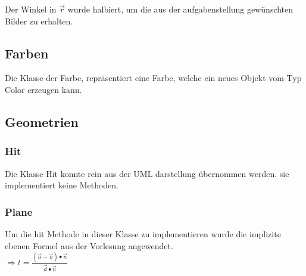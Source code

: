 \documentclass[14pt]{extarticle}
\begin{document}
Der Winkel in \begin{math}\vec{r}\end{math} wurde halbiert, um die aus der aufgabenstellung gewünschten Bilder zu erhalten.

\subsection{Farben}
Die Klasse der Farbe, repräsentiert eine Farbe, welche ein neues Objekt vom Typ Color erzeugen kann.
\subsection{Geometrien}
\subsubsection{Hit}
Die Klasse Hit konnte rein aus der UML darstellung übernommen werden. sie implementiert keine Methoden. 
\subsubsection{Plane}
Um die hit Methode in dieser Klasse zu implementieren wurde die implizite ebenen Formel aus der Vorlesung angewendet.\\
\begin{math}\Rightarrow t= \frac{(\vec{a}-\vec{o})\bullet \vec{n}}{\vec{d}\bullet \vec{n}}\end{math}\\\\
\end{document}
